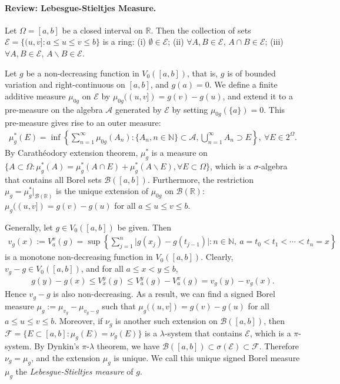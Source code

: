 \documentclass{article}
\begin{document}
\paragraph{Review: Lebesgue-Stieltjes Measure.} Let $\Omega=[a,b]$ be a closed interval on $\mathbb{R}$. Then the collection of sets $\mathcal{E} = \{(u,v]:a\leq u\leq v \leq b\}$
is a ring: (i) $\emptyset\in\mathcal{E}$; (ii) $\forall A,B\in\mathcal{E}$, $A\cap B\in\mathcal{E}$; (iii) $\forall A,B\in\mathcal{E}$, $A\backslash B \in \mathcal{E}$.

Let $g$ be a non-decreasing function in $V_0([a,b])$, that is, $g$ is of bounded variation and right-continuous on $[a,b]$, and $g(a)=0$. We define a finite additive measure $\mu_{0g}$ on $\mathcal{E}$ by $\mu_{0g}((u,v]) = g(v)-g(u)$, and extend it to a pre-measure on the algebra $\mathcal{A}$ generated by $\mathcal{E}$ by setting $\mu_{0g}(\{a\})=0$. This pre-measure gives rise to an outer measure:
\begin{align*}
	\mu^*_g(E) = \inf\left\{\sum_{n=1}^\infty \mu_{0g}(A_n):\{A_n,n\in\mathbb{N}\}\subset\mathcal{A},\bigcup_{n=1}^\infty A_n\supset E\right\},\ \forall E\in 2^{\Omega}.
\end{align*}
By Carathéodory extension theorem, $\mu^*_g$ is a measure on $\{A\subset\Omega:\mu^*_g(A)=\mu^*_g(A\cap E) + \mu_g^*(A\backslash E),\forall E\subset\Omega\}$, which is a $\sigma$-algebra that contains all Borel sets $\mathscr{B}([a,b])$. Furthermore, the restriction $\mu_g=\mu_g^*|_{\mathscr{B}(\mathbb{R})}$ is the unique extension of $\mu_{0g}$ on $\mathscr{B}(\mathbb{R})$: $\mu_g((u,v])=g(v)-g(u)$ for all $a\leq u\leq v\leq b$.
\vspace{0.05cm}

Generally, let $g\in V_0([a,b])$ be given. Then 
\begin{align*}
	v_g(x) := V_a^x(g) = \sup\left\{\sum_{j=1}^n \vert g(x_j) - g(t_{j-1})\vert: n\in\mathbb{N},\ a=t_0<t_1<\cdots<t_n=x\right\}
\end{align*}
is a monotone non-decreasing function in $V_0([a,b])$. Clearly, $v_g - g\in V_0([a,b])$, and for all $a\leq x < y\leq b$,
\begin{align*}
	g(y) - g(x)\leq V_x^y(g) \leq V_a^y(g) - V_a^x(g) = v_g(y) - v_g(x).
\end{align*}
Hence $v_g-g$ is also non-decreasing. As a result, we can find a signed Borel measure $\mu_g:=\mu_{v_g} - \mu_{v_g-g}$ such that $\mu_g((u,v])=g(v)-g(u)$ for all $a\leq u\leq v\leq b$. Moreover, if $\nu_g$ is another such extension on $\mathscr{B}([a,b])$, then $\mathcal{F}=\{E\subset[a,b]:\mu_g(E)=\nu_g(E)\}$ is a $\lambda$-system that contains $\mathcal{E}$, which is a $\pi$-system. By Dynkin's $\pi$-$\lambda$ theorem, we have $\mathscr{B}([a,b])\subset\sigma(\mathcal{E})\subset\mathcal{F}$. Therefore $\nu_g=\mu_g$, and the extension $\mu_g$ is unique. We call this unique signed Borel measure $\mu_g$ the \textit{Lebesgue-Stieltjes measure} of $g$.
\end{document}
